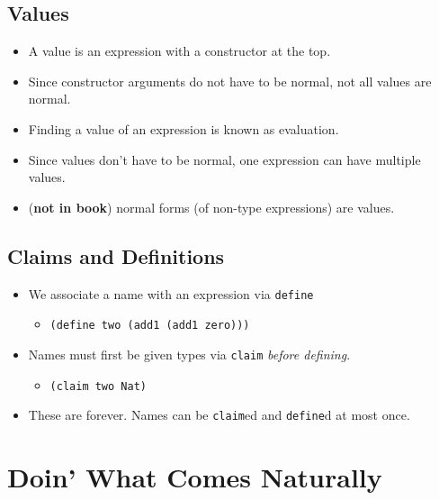 \documentclass{article}
\newcommand{\ttt}[1]{\texttt{#1}}
\begin{document}
\subsection{Values}
\begin{itemize}
    \item A value is an expression with a constructor at the top.
    \item Since constructor arguments do not have to be normal, not all values are normal.
    \item Finding a value of an expression is known as evaluation.
    \item Since values don't have to be normal, one expression can have multiple values.
    \item (\textbf{not in book}) normal forms (of non-type expressions) are values.
\end{itemize}

\subsection{Claims and Definitions}
\begin{itemize}
    \item We associate a name with an expression via \ttt{define}
    \begin{itemize}
        \item \ttt{(define two (add1 (add1 zero)))}
    \end{itemize}
    \item Names must first be given types via \ttt{claim} \textit{before defining}.
    \begin{itemize}
        \item \ttt{(claim two Nat)}
    \end{itemize}
    \item These are forever. Names can be \ttt{claim}ed and \ttt{define}d at most once.
\end{itemize}

\section{Doin' What Comes Naturally}
\end{document}
